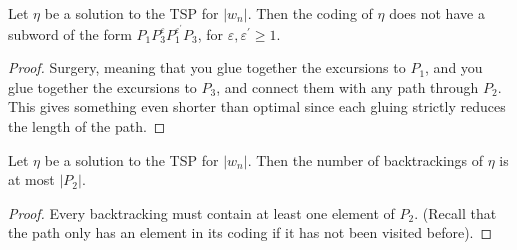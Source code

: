 \begin{lem}\label{lem: groceries lemma p1p3p1p3}
	Let $\eta$ be a solution to the TSP for $|w_n|$. Then the coding of $\eta$ does not have a subword of the form $P_1P_3^{\varepsilon}P_1^{\varepsilon^{\prime }}P_3$, for $\varepsilon, \varepsilon^{\prime}\ge 1$.
\end{lem}
\begin{proof}
	Surgery, meaning that you glue together the excursions to $P_1$, and you glue together the excursions to $P_3$, and connect them with any path through $P_2$. This gives something even shorter than optimal since each gluing strictly reduces the length of the path.
\end{proof}

\begin{cor}\label{cor: number of backtrackings}
	Let $\eta$ be a solution to the TSP for $|w_n|$. Then the number of backtrackings of $\eta$ is at most $|P_2|$.
\end{cor}
\begin{proof}
	Every backtracking must contain at least one element of $P_2$. (Recall that the path only has an element in its coding if it has not been visited before).
\end{proof}

